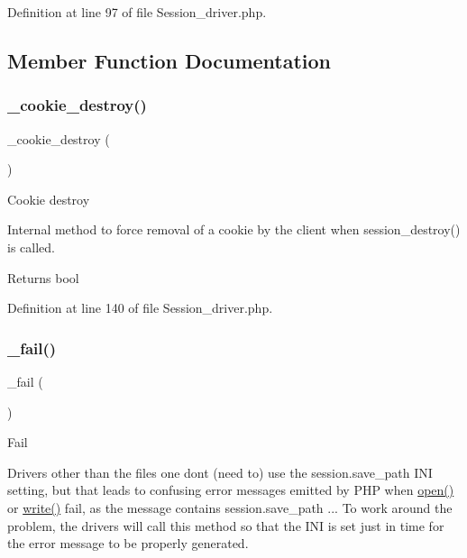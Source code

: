 Definition at line 97 of file Session\+\_\+driver.\+php.



\subsection{Member Function Documentation}
\mbox{\label{class_c_i___session__driver_a36771b622e8a8928c1c931ac56c12434}} 
\subsubsection{\texorpdfstring{\_cookie\_destroy()}{\_cookie\_destroy()}}
{\footnotesize\ttfamily \+\_\+cookie\+\_\+destroy (\begin{DoxyParamCaption}{ }\end{DoxyParamCaption})\hspace{0.3cm}{\ttfamily [protected]}}

Cookie destroy

Internal method to force removal of a cookie by the client when session\+\_\+destroy() is called.

\begin{DoxyReturn}{Returns}
bool 
\end{DoxyReturn}


Definition at line 140 of file Session\+\_\+driver.\+php.

\mbox{\label{class_c_i___session__driver_a1b1bf5bb9cba50e84f985c30f6b64773}} 
\subsubsection{\texorpdfstring{\_fail()}{\_fail()}}
{\footnotesize\ttfamily \+\_\+fail (\begin{DoxyParamCaption}{ }\end{DoxyParamCaption})\hspace{0.3cm}{\ttfamily [protected]}}

Fail

Drivers other than the \textquotesingle{}files\textquotesingle{} one don\textquotesingle{}t (need to) use the session.\+save\+\_\+path I\+NI setting, but that leads to confusing error messages emitted by P\+HP when \mbox{\hyperlink{interface_session_handler_interface_a614b5cf3840833913c7a73260ed28e02}{open()}} or \mbox{\hyperlink{interface_session_handler_interface_ad9d124885be93668f1dbf6aace5964f5}{write()}} fail, as the message contains session.\+save\+\_\+path ... To work around the problem, the drivers will call this method so that the I\+NI is set just in time for the error message to be properly generated.

